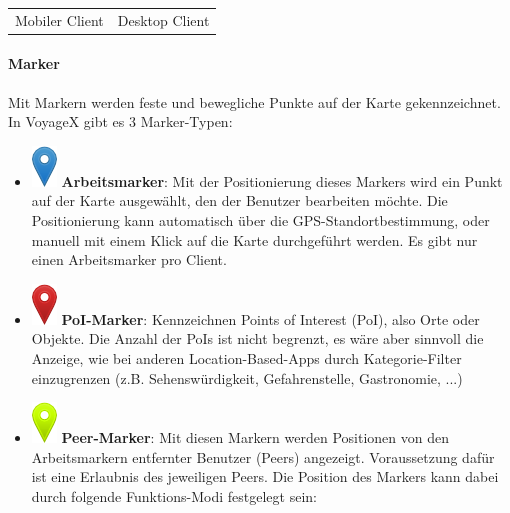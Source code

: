 \begin{table}[H]
\begin{adjustwidth}{-0.7cm}{0.7cm}
\begin{tabulary}{\columnwidth}{ c c }
	Mobiler Client & Desktop Client \\
  \end{tabulary}
  \end{adjustwidth}
\end{table}

\paragraph{Marker}
Mit Markern werden feste und bewegliche Punkte auf der Karte gekennzeichnet. In VoyageX gibt es 3 Marker-Typen:
\begin{itemize}[leftmargin=*,noitemsep,topsep=1ex,parsep=0pt,partopsep=0pt]
\item \includegraphics[scale=0.3]{bilder/marker-icon-blue.png} \textbf{Arbeitsmarker}: Mit der Positionierung dieses Markers wird ein Punkt auf der Karte ausgewählt, den der Benutzer bearbeiten möchte. Die Positionierung kann automatisch über die GPS-Standortbestimmung, oder manuell mit einem Klick auf die Karte durchgeführt werden. Es gibt nur einen Arbeitsmarker pro Client.
\item \includegraphics[scale=0.3]{bilder/marker-icon-red.png} \textbf{PoI-Marker}: Kennzeichnen Points of Interest (PoI), also Orte oder Objekte. Die Anzahl der PoIs ist nicht begrenzt, es wäre aber sinnvoll die Anzeige, wie bei anderen Location-Based-Apps durch Kategorie-Filter einzugrenzen (z.B. Sehenswürdigkeit, Gefahrenstelle, Gastronomie, ...)
\item \includegraphics[scale=0.3]{bilder/marker-icon-yellow.png} \textbf{Peer-Marker}: Mit diesen Markern werden Positionen von den Arbeitsmarkern entfernter Benutzer (Peers) angezeigt. Voraussetzung dafür ist eine Erlaubnis des jeweiligen Peers. Die Position des Markers kann dabei durch folgende Funktions-Modi festgelegt sein:

\end{itemize}

